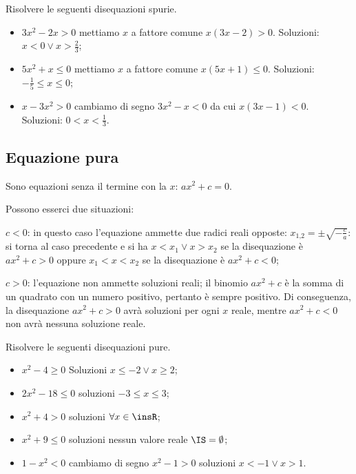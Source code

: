 \begin{exrig}
\begin{esempio}
Risolvere le seguenti disequazioni spurie.
\begin{itemize}
\item $3x^2-2x>0$ mettiamo $x$ a fattore comune $x(3x-2)>0$. Soluzioni: $x<0\vee x>\frac 2 3$;
\item $5x^2+x\le 0$ mettiamo $x$ a fattore comune $x(5x+1)\le 0$. Soluzioni: $-\frac 1 5\le x\le 0$;
\item $x-3x^2>0$ cambiamo di segno $3x^2-x<0$ da cui $x(3x-1)<0$. Soluzioni: $0<x<\frac 1 3$.
\end{itemize}
\end{esempio}
\end{exrig}

\subsection{Equazione pura}
Sono equazioni senza il termine con la $ x $: $ax^2+c=0$.

Possono esserci due situazioni:
\begin{itemize*}
\item $c<0$: in questo caso l'equazione ammette due radici reali opposte: $x_{1\text{,}2}=\pm \sqrt{-\frac c a}$: si torna al caso precedente e si ha $x<x_1\vee x>x_2$ se la disequazione è $ax^2+c>0$ oppure $x_1<x<x_2$ se la disequazione è $ax^2+c<0$;
\item $c>0$: l'equazione non ammette soluzioni reali; il binomio $ax^2+c$ è la somma di un quadrato con un numero positivo, pertanto è sempre positivo. Di conseguenza, la disequazione $ax^2+c>0$ avrà soluzioni per ogni $x$ reale, mentre $ax^2+c<0$ non avrà nessuna soluzione reale.
\end{itemize*}

\begin{exrig}
\begin{esempio}
Risolvere le seguenti disequazioni pure.
\begin{itemize}
\item $x^2-4\ge 0$ Soluzioni $x\le -2\vee x\ge 2$;
\item $2x^2-18\le 0$ soluzioni $-3\le x\le 3$;
\item $x^2+4>0$ soluzioni $\forall x\in \insR$;
\item $x^2+9\le 0$ soluzioni nessun valore reale $\IS=\emptyset$;
\item $1-x^2<0$ cambiamo di segno $x^2-1>0$ soluzioni $x<-1\vee x>1$.
\end{itemize}
\end{esempio}
\end{exrig}

